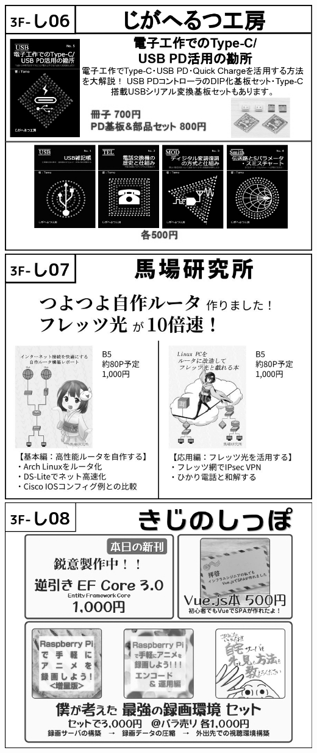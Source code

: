 \begin{center}
\includegraphics[width=0.9\linewidth]{images/circle-appeals/3F-し06.jpg}
\includegraphics[width=0.9\linewidth]{images/circle-appeals/3F-し07.jpg}
\includegraphics[width=0.9\linewidth]{images/circle-appeals/3F-し08.jpg}

\end{center}
